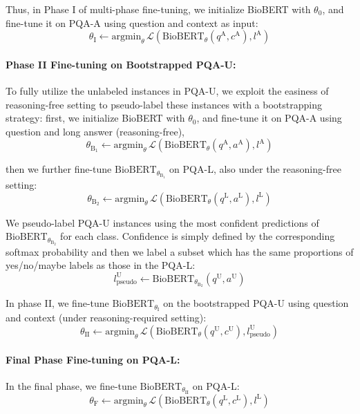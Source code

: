 \documentclass[11pt,a4paper]{article}
\begin{document}
Thus, in Phase I of multi-phase fine-tuning, we initialize BioBERT with $\theta_0$, and fine-tune it on PQA-A using question and context as input:
\[ \label{eq1}
\theta_\text{I} \gets \mathrm{argmin}_\theta \, \mathcal{L}(\text{BioBERT}_{\theta}(q^\text{A},c^\text{A}), l^\text{A}) \tag{1}
\]

\paragraph{Phase II Fine-tuning on Bootstrapped PQA-U:}
To fully utilize the unlabeled instances in PQA-U, we exploit the easiness of reasoning-free setting to pseudo-label these instances with a bootstrapping strategy: first, we initialize BioBERT with $\theta_0$, and fine-tune it on PQA-A using question and long answer (reasoning-free), 
\[ \label{eq2}
\theta_{\text{B}_1} \gets \mathrm{argmin}_\theta \, \mathcal{L}(\text{BioBERT}_{\theta}(q^\text{A},a^\text{A}), l^\text{A}) \tag{2}
\]

then we further fine-tune $\text{BioBERT}_{\theta_{\text{B}_1}}$ on PQA-L, also under the reasoning-free setting:
\[ \label{eq3}
\theta_{\text{B}_2} \gets \mathrm{argmin}_\theta \, \mathcal{L}(\text{BioBERT}_{\theta}(q^\text{L},a^\text{L}), l^\text{L}) \tag{3}
\]

We pseudo-label PQA-U instances using the most confident predictions of $\text{BioBERT}_{\theta_{\text{B}_2}}$ for each class. Confidence is simply defined by the corresponding softmax probability and then we label a subset which has the same proportions of yes/no/maybe labels as those in the PQA-L:
\[\label{eq4}
l^\text{U}_\text{pseudo} \gets \text{BioBERT}_{\theta_{\text{B}_2}}(q^\text{U},a^\text{U}) \tag{4}
\]

In phase II, we fine-tune $\text{BioBERT}_{\theta_\text{I}}$ on the bootstrapped PQA-U using question and context (under reasoning-required setting):
\[ \label{eq5}
\theta_\text{II} \gets \mathrm{argmin}_\theta \, \mathcal{L}(\text{BioBERT}_{\theta}(q^\text{U},c^\text{U}), l^\text{U}_\text{pseudo}) \tag{5}
\]

\paragraph{Final Phase Fine-tuning on PQA-L:}
In the final phase, we fine-tune $\text{BioBERT}_{\theta_\text{II}}$ on PQA-L:
\[ \label{eq6}
\theta_{\text{F}} \gets \mathrm{argmin}_\theta \, \mathcal{L}(\text{BioBERT}_{\theta}(q^\text{L},c^\text{L}), l^\text{L}) \tag{6}
\]
\end{document}
